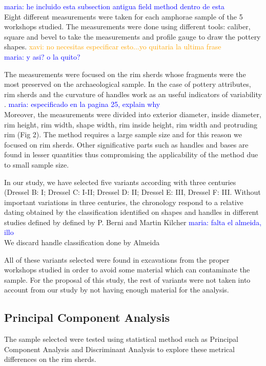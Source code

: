 \documentclass[review]{elsarticle}
\newcommand{\memo}[2]{\textcolor{#1}{#2}}
\newcommand{\xavi}[1]{\memo{orange}{xavi: #1\\}}
\newcommand{\maria}[1]{\memo{blue}{maria: #1\\}}
\begin{document}
\maria{he incluido esta subsection antigua field method dentro de esta}
Eight different measurements were taken for each amphorae sample of the 5 workshops studied. The measurements were done using different tools: caliber, square and bevel to take the measurements and profile gauge to draw the pottery shapes. \xavi{no necesitas especificar esto...yo quitaria la ultima frase} \maria{y asi? o la quito?}

The measurements were focused on the rim sherds whose fragments were the most preserved on the archaeological sample. In the case of pottery attributes, rim sherds and the curvature of handles work as an useful indicators of variability \citep{berni_millet_epigrafianforica_2008}. \maria{especificado en la pagina 25, explain why}
Moreover, the measurements were divided into exterior diameter, inside diameter, rim height, rim width, shape width, rim inside height, rim width and protruding rim (Fig 2). The method requires a large sample size and for this reason we focused on rim sherds. Other significative parts such as handles and bases are found in lesser quantities thus compromising the applicability of the method due to small sample size.

In our study, we have selected five variants according with three centuries
(Dressel B: I; Dressel C: I-II; Dressel D: II; Dressel E: III, Dressel F: III. Without important variations in three centuries, the chronology respond to a relative dating obtained by the classification identified on shapes and handles in different studies defined by defined by P. Berni \citep{berni_millet_epigrafianforica_2008} and Martin Kilcher \citep{martin-kilcher_romischen_1994} \maria{falta el almeida, illo}
We discard handle classification done by Almeida 



All of these variants selected were found in excavations from the proper workshops studied in order to avoid some material which can contaminate the sample. For the proposal of this study, the rest of variants were not taken into account from our study by not having enough material for the analysis. 


\subsection{Principal Component Analysis}

The sample selected were tested using statistical method such as Principal Component Analysis and Discriminant Analysis to explore these metrical differences on the rim sherds. 
\end{document}
